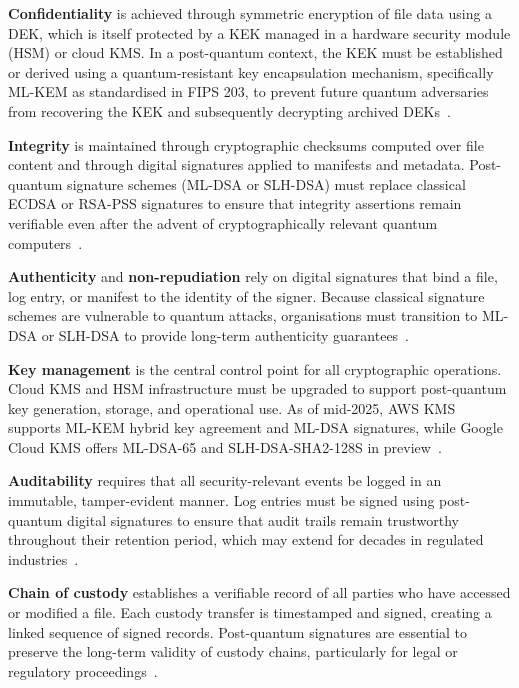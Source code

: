 \documentclass[12pt,a4paper]{article}
\begin{document}
\textbf{Confidentiality} is achieved through symmetric encryption of file data using a DEK, which is itself protected by a KEK managed in a hardware security module (HSM) or cloud KMS. In a post-quantum context, the KEK must be established or derived using a quantum-resistant key encapsulation mechanism, specifically ML-KEM as standardised in FIPS 203, to prevent future quantum adversaries from recovering the KEK and subsequently decrypting archived DEKs~\cite{nist-fips-203-2024,aws-mlkem-kms-2025}.

\textbf{Integrity} is maintained through cryptographic checksums computed over file content and through digital signatures applied to manifests and metadata. Post-quantum signature schemes (ML-DSA or SLH-DSA) must replace classical ECDSA or RSA-PSS signatures to ensure that integrity assertions remain verifiable even after the advent of cryptographically relevant quantum computers~\cite{nist-fips-204-2024,nist-fips-205-2024}.

\textbf{Authenticity} and \textbf{non-repudiation} rely on digital signatures that bind a file, log entry, or manifest to the identity of the signer. Because classical signature schemes are vulnerable to quantum attacks, organisations must transition to ML-DSA or SLH-DSA to provide long-term authenticity guarantees~\cite{nist-fips-204-2024,nist-fips-205-2024}.

\textbf{Key management} is the central control point for all cryptographic operations. Cloud KMS and HSM infrastructure must be upgraded to support post-quantum key generation, storage, and operational use. As of mid-2025, AWS KMS supports ML-KEM hybrid key agreement and ML-DSA signatures, while Google Cloud KMS offers ML-DSA-65 and SLH-DSA-SHA2-128S in preview~\cite{aws-kms-mldsa-2025,google-cloud-kms-pqc-2025}.

\textbf{Auditability} requires that all security-relevant events be logged in an immutable, tamper-evident manner. Log entries must be signed using post-quantum digital signatures to ensure that audit trails remain trustworthy throughout their retention period, which may extend for decades in regulated industries~\cite{nist-sp800-92-2006}.

\textbf{Chain of custody} establishes a verifiable record of all parties who have accessed or modified a file. Each custody transfer is timestamped and signed, creating a linked sequence of signed records. Post-quantum signatures are essential to preserve the long-term validity of custody chains, particularly for legal or regulatory proceedings~\cite{nist-sp800-161-2022}.
\end{document}
